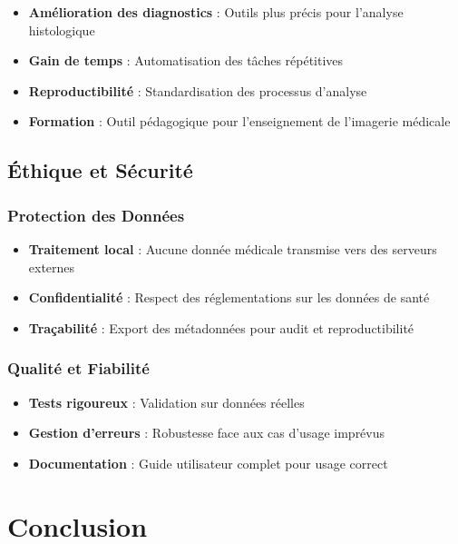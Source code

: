 \documentclass[12pt,a4paper]{article}
\begin{document}
\begin{itemize}
\item \textbf{Amélioration des diagnostics} : Outils plus précis pour l'analyse histologique
\item \textbf{Gain de temps} : Automatisation des tâches répétitives
\item \textbf{Reproductibilité} : Standardisation des processus d'analyse
\item \textbf{Formation} : Outil pédagogique pour l'enseignement de l'imagerie médicale
\end{itemize}

\subsection{Éthique et Sécurité}

\subsubsection{Protection des Données}

\begin{itemize}
\item \textbf{Traitement local} : Aucune donnée médicale transmise vers des serveurs externes
\item \textbf{Confidentialité} : Respect des réglementations sur les données de santé
\item \textbf{Traçabilité} : Export des métadonnées pour audit et reproductibilité
\end{itemize}

\subsubsection{Qualité et Fiabilité}

\begin{itemize}
\item \textbf{Tests rigoureux} : Validation sur données réelles
\item \textbf{Gestion d'erreurs} : Robustesse face aux cas d'usage imprévus
\item \textbf{Documentation} : Guide utilisateur complet pour usage correct
\end{itemize}

\newpage

\section{Conclusion}
\end{document}
